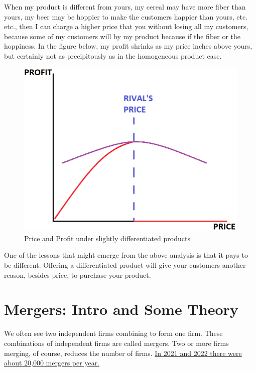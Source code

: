 \documentclass[
]{book}
\begin{document}
When my product is different from yours, my cereal may have more fiber than yours, my beer may be hoppier to make the customers happier than yours, etc. etc., then I can charge a higher price that you without losing all my customers, because some of my customers will by my product because if the fiber or the hoppiness. In the figure below, my profit shrinks as my price inches above yours, but certainly not as precipitously as in the homogeneous product case.

\begin{figure}

{\centering \includegraphics[width=0.5\linewidth]{img/oligopoly/fig7} 

}

\caption{Price and Profit under slightly differentiated products}\label{fig:oligopoly07}
\end{figure}

One of the lessons that might emerge from the above analysis is that it pays to be different. Offering a differentiated product will give your customers another reason, besides price, to purchase your product.

\hypertarget{mergers-intro-and-some-theory}{%
\section{Mergers: Intro and Some Theory}\label{mergers-intro-and-some-theory}}

We often see two independent firms combining to form one firm. These combinations of independent firms are called mergers. Two or more firms merging, of course, reduces the number of firms. \href{https://www.statista.com/statistics/245977/number-of-munda-deals-in-the-united-states/\#:~:text=The\%20overall\%20number\%20of\%20M\%26A,23\%2C161\%20in\%20the\%20previous\%20year.\&text=Merger\%20and\%20acquisition\%20(M\%26A)\%20refers,the\%20consolidation\%20of\%20two\%20companies}{In 2021 and 2022 there were about 20,000 mergers per year.}
\end{document}
